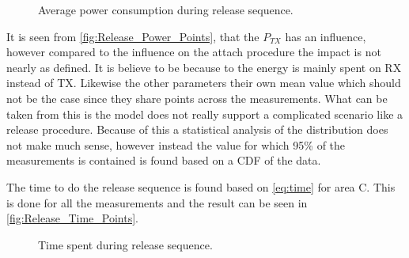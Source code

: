 \begin{figure}[H]
\centering
\begin{minipage}{0.48\textwidth}
\resizebox{\textwidth}{!}{
}
\end{minipage}
\hfill
\begin{minipage}{0.48\textwidth}
\resizebox{\textwidth}{!}{
}
\end{minipage}
\caption{Average power consumption during release sequence.}
\label{fig:Release_Power_Points}
\end{figure}

It is seen from \autoref{fig:Release_Power_Points}, that the $P_{TX}$ has an influence, however compared to the influence on the attach procedure the impact is not nearly as defined. It is believe to be because to the energy is mainly spent on RX instead of TX. Likewise the other parameters their own mean value which should not be the case since they share points across the measurements. What can be taken from this is the model does not really support a complicated scenario like a release procedure. Because of this a statistical analysis of the distribution does not make much sense, however instead the value for which 95\% of the measurements is contained is found based on a CDF of the data. 

The time to do the release sequence is found based on \autoref{eq:time} for area C. This is done for all the measurements and the result can be seen in \autoref{fig:Release_Time_Points}. 

\begin{figure}[H]
\centering
\begin{minipage}{0.48\textwidth}
\resizebox{\textwidth}{!}{
}
\end{minipage}
\hfill
\begin{minipage}{0.48\textwidth}
\resizebox{\textwidth}{!}{
}
\end{minipage}
\caption{Time spent during release sequence.}
\label{fig:Release_Time_Points}
\end{figure}


